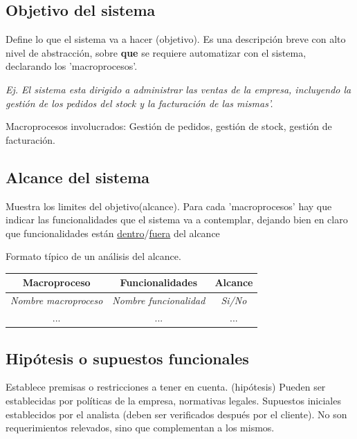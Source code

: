 \documentclass[titlepage,a4paper]{article}
\begin{document}
\subsection{Objetivo del sistema}
Define lo que el sistema va a hacer (objetivo).
Es una descripción breve con alto nivel de abstracción, sobre \textbf{que} se requiere automatizar con el sistema, declarando los 'macroprocesos'.

\textit{Ej.
El sistema esta dirigido a administrar las ventas de la empresa, incluyendo la gestión de los pedidos del stock y la facturación de las mismas'.}

Macroprocesos involucrados: Gestión de pedidos, gestión de stock, gestión de facturación.

\subsection{Alcance del sistema}
Muestra los limites del objetivo(alcance). Para cada 'macroprocesos' hay que indicar las funcionalidades que el sistema va a contemplar,
dejando bien en claro que funcionalidades están \underline{dentro}/\underline{fuera} del alcance

Formato típico de un análisis del alcance.



\begin{table}[]
\begin{center}
\begin{tabular}{|l|l|c|}
\hline
\multicolumn{1}{|c|}{Macroproceso} & \multicolumn{1}{c|}{Funcionalidades} & Alcance \\ \hline
\textit{Nombre macroproceso}      & \textit{Nombre funcionalidad}       & \textit{Si/No} \\ \hline
 \multicolumn{1}{|c|}{...}          & \multicolumn{1}{c|}{...}            & ...            \\ \hline
\end{tabular}
\end{center}
\end{table}


\subsection{Hipótesis o supuestos funcionales}
Establece premisas o restricciones a tener en cuenta. (hipótesis)
Pueden ser establecidas por políticas de la empresa, normativas legales. Supuestos iniciales establecidos por el analista (deben ser verificados después por el cliente). No son requerimientos relevados, sino que complementan a los mismos.
\end{document}
